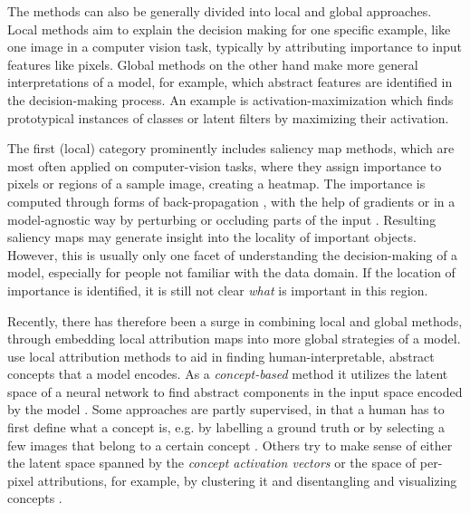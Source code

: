 The methods can also be generally divided into local and global approaches. Local methods aim to explain the decision making for one specific example, like one image in a computer vision task, typically by attributing importance to input features like pixels. Global methods on the other hand make more general interpretations of a model, for example, which abstract features are identified in the decision-making process. An example is activation-maximization \cite{Nguyen2016} which finds prototypical instances of classes or latent filters by maximizing their activation. 

The first (local) category prominently includes saliency map methods, which are most often applied on computer-vision tasks, where they assign importance to pixels or regions of a sample image, creating a heatmap. 
The importance is computed through forms of back-propagation \cite{Bach2015,Zhang2016,Kindermans2017}, with the help of gradients \cite{Sundararajan2017,Smilkov2017} or in a model-agnostic way by perturbing or occluding parts of the input \cite{Lundberg2017,Zeiler2013,Zintgraf2017,Agarwal2020}. Resulting saliency maps may generate insight into the locality of important objects. However, this is usually only one facet of understanding the decision-making of a model, especially for people not familiar with the data domain. If the location of importance is identified, it is still not clear \textit{what} is important in this region.   

Recently, there has therefore been a surge in combining local and global methods, through embedding local attribution maps into more global strategies of a model. \cite{Achtibat2022} use local attribution methods to aid in finding human-interpretable, abstract concepts that a model encodes. As a \textit{concept-based} method it utilizes the latent space of a neural network to find abstract components in the input space encoded by the model \citep{Bau2017,Bau2020,Kim2018, Ghorbani2019, Zhang2021, Fel2023a}. 
Some approaches are partly supervised, in that a human has to first define what a concept is, e.g. by labelling a ground truth or by selecting a few images that belong to a certain concept \citep{Kim2018, Singla2022}. Others try to make sense of either the latent space spanned by the \textit{concept activation vectors} or the space of per-pixel attributions, for example, by clustering it \citep{Lapuschkin2019,Vielhaben2023} and disentangling and visualizing concepts  \citep{Ghorbani2019,Zhang2021,Leemann2023,Fel2023,Chormai2022, Singla2022}.


